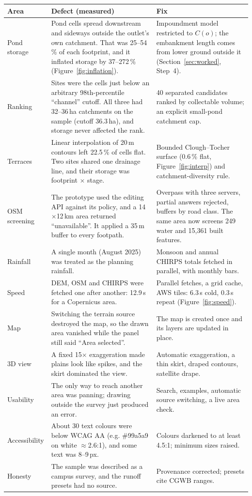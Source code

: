 \documentclass[11pt,a4paper]{article}
\begin{document}
\begin{tabularx}{\linewidth}{@{}L{28mm}YY@{}}
\toprule
\textbf{Area} & \textbf{Defect (measured)} & \textbf{Fix}\\
\midrule
Pond storage & Pond cells spread downstream and sideways outside the outlet's own catchment. That was 25--54\,\% of each footprint, and it inflated storage by 37--272\,\% (Figure~\ref{fig:inflation}). & Impoundment model restricted to $C(o)$; the embankment length comes from lower ground outside it (Section~\ref{sec:worked}, Step~4).\\
Ranking & Sites were the cells just below an arbitrary 98th-percentile ``channel'' cutoff. All three had 32--36\,ha catchments on the sample (cutoff 36.3\,ha), and storage never affected the rank. & 40 separated candidates ranked by collectable volume; an explicit small-pond catchment cap.\\
Terraces & Linear interpolation of 20\,m contours left 22.5\,\% of cells flat. Two sites shared one drainage line, and their storage was footprint $\times$ stage. & Bounded Clough--Tocher surface (0.6\,\% flat, Figure~\ref{fig:interp}) and catchment-diversity rule.\\
OSM screening & The prototype used the editing API against its policy, and a 14$\times$12\,km area returned ``unavailable''. It applied a 35\,m buffer to every footpath. & Overpass with three servers, partial answers rejected, buffers by road class. The same area now screens 249 water and 15,361 built features.\\
Rainfall & A single month (August 2025) was treated as the planning rainfall. & Monsoon and annual CHIRPS totals fetched in parallel, with monthly bars.\\
Speed & DEM, OSM and CHIRPS were fetched one after another: 12.9\,s for a Copernicus area. & Parallel fetches, a grid cache, AWS tiles: 6.3\,s cold, 0.3\,s repeat (Figure~\ref{fig:speed}).\\
Map & Switching the terrain source destroyed the map, so the drawn area vanished while the panel still said ``Area selected''. & The map is created once and its layers are updated in place.\\
3D view & A fixed 15$\times$ exaggeration made plains look like spikes, and the skirt dominated the view. & Automatic exaggeration, a thin skirt, draped contours, satellite drape.\\
Usability & The only way to reach another area was panning; drawing outside the survey just produced an error. & Search, examples, automatic source switching, a live area check.\\
Accessibility & About 30 text colours were below WCAG AA (e.g. \#99a5a9 on white $\approx$2.6:1), and some text was 8--9\,px. & Colours darkened to at least 4.5:1; minimum sizes raised.\\
Honesty & The sample was described as a campus survey, and the runoff presets had no source. & Provenance corrected; presets cite CGWB ranges.\\
\bottomrule
\end{tabularx}
\end{document}
